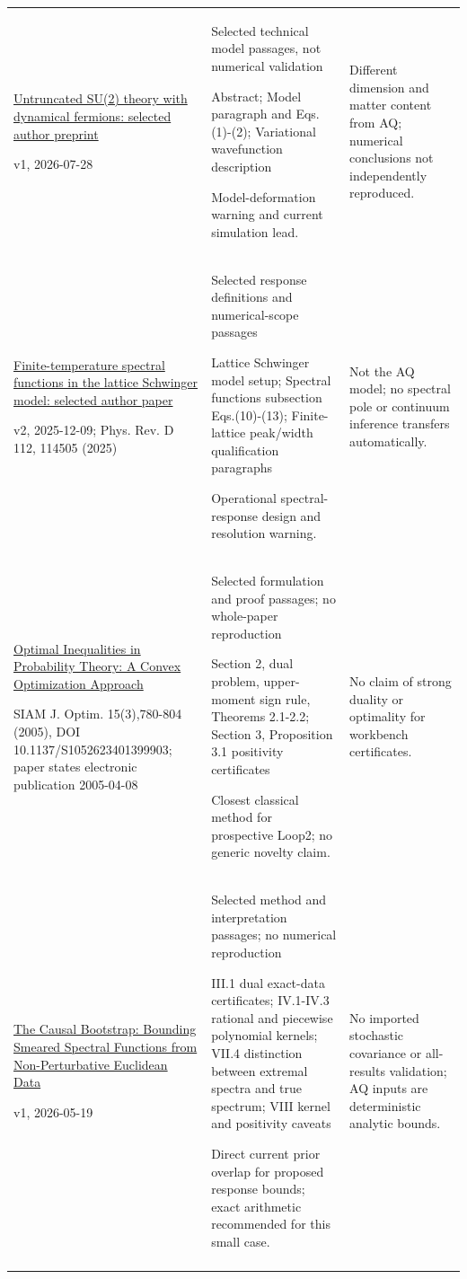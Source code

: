 \begin{longtable}{@{}p{43mm}p{65mm}p{44mm}@{}}
\href{https://arxiv.org/html/2607.26132v1}{Untruncated SU(2) theory with dynamical fermions: selected author preprint}\par v1, 2026-07-28 & Selected technical model passages, not numerical validation\par Abstract; Model paragraph and Eqs.(1)-(2); Variational wavefunction description\par Model-deformation warning and current simulation lead. & Different dimension and matter content from AQ; numerical conclusions not independently reproduced.\\\addlinespace
\href{https://arxiv.org/html/2507.16890v2}{Finite-temperature spectral functions in the lattice Schwinger model: selected author paper}\par v2, 2025-12-09; Phys. Rev. D 112, 114505 (2025) & Selected response definitions and numerical-scope passages\par Lattice Schwinger model setup; Spectral functions subsection Eqs.(10)-(13); Finite-lattice peak/width qualification paragraphs\par Operational spectral-response design and resolution warning. & Not the AQ model; no spectral pole or continuum inference transfers automatically.\\\addlinespace
\href{https://web.mit.edu/dbertsim/www/papers/MomentProblems/Optimal-inequalities-in-probability-theory-A-convex-optimization-approach-SIAM15.pdf}{Optimal Inequalities in Probability Theory: A Convex Optimization Approach}\par SIAM J. Optim. 15(3),780-804 (2005), DOI 10.1137/S1052623401399903; paper states electronic publication 2005-04-08 & Selected formulation and proof passages; no whole-paper reproduction\par Section 2, dual problem, upper-moment sign rule, Theorems 2.1-2.2; Section 3, Proposition 3.1 positivity certificates\par Closest classical method for prospective Loop2; no generic novelty claim. & No claim of strong duality or optimality for workbench certificates.\\\addlinespace
\href{https://arxiv.org/html/2605.20509v1}{The Causal Bootstrap: Bounding Smeared Spectral Functions from Non-Perturbative Euclidean Data}\par v1, 2026-05-19 & Selected method and interpretation passages; no numerical reproduction\par III.1 dual exact-data certificates; IV.1-IV.3 rational and piecewise polynomial kernels; VII.4 distinction between extremal spectra and true spectrum; VIII kernel and positivity caveats\par Direct current prior overlap for proposed response bounds; exact arithmetic recommended for this small case. & No imported stochastic covariance or all-results validation; AQ inputs are deterministic analytic bounds.\\\addlinespace

\end{longtable}
